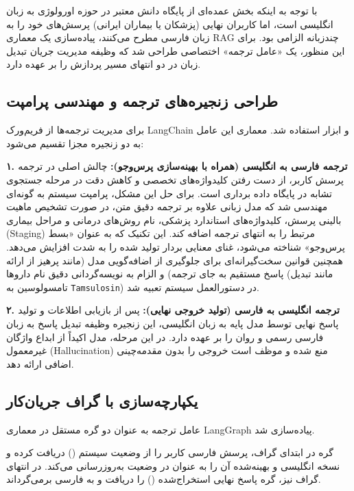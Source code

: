 با توجه به اینکه بخش عمده‌ای از پایگاه دانش معتبر در حوزه اورولوژی به زبان انگلیسی است، اما کاربران نهایی (پزشکان یا بیماران ایرانی) پرسش‌های خود را به زبان فارسی مطرح می‌کنند، پیاده‌سازی یک معماری RAG چندزبانه الزامی بود. برای این منظور، یک «عامل ترجمه» اختصاصی طراحی شد که وظیفه مدیریت جریان تبدیل زبان در دو انتهای مسیر پردازش را بر عهده دارد.

\subsection{طراحی زنجیره‌های ترجمه و مهندسی پرامپت}
برای مدیریت ترجمه‌ها از فریم‌ورک LangChain و ابزار  استفاده شد. معماری این عامل به دو زنجیره مجزا تقسیم می‌شود:

\textbf{۱. ترجمه فارسی به انگلیسی (همراه با بهینه‌سازی پرس‌وجو):}
چالش اصلی در ترجمه پرسش کاربر، از دست رفتن کلیدواژه‌های تخصصی و کاهش دقت در مرحله جستجوی تشابه در پایگاه داده برداری است. برای حل این مشکل، پرامپت سیستم به گونه‌ای مهندسی شد که مدل زبانی علاوه بر ترجمه دقیق متن، در صورت تشخیص ماهیت بالینی پرسش، کلیدواژه‌های استاندارد پزشکی، نام روش‌های درمانی و مراحل بیماری (Staging) مرتبط را به انتهای ترجمه اضافه کند. این تکنیک که به عنوان «بسط پرس‌وجو» شناخته می‌شود، غنای معنایی بردار تولید شده را به شدت افزایش می‌دهد.
همچنین قوانین سخت‌گیرانه‌ای برای جلوگیری از اضافه‌گویی مدل (مانند پرهیز از ارائه پاسخ مستقیم به جای ترجمه) و الزام به نویسه‌گردانی دقیق نام داروها (مانند تبدیل تامسولوسین به \texttt{Tamsulosin}) در دستورالعمل سیستم تعبیه شد.

\textbf{۲. ترجمه انگلیسی به فارسی (تولید خروجی نهایی):}
پس از بازیابی اطلاعات و تولید پاسخ نهایی توسط مدل پایه به زبان انگلیسی، این زنجیره وظیفه تبدیل پاسخ به زبان فارسی رسمی و روان را بر عهده دارد. در این مرحله، مدل اکیداً از ابداع واژگان غیرمعمول (Hallucination) منع شده و موظف است خروجی را بدون مقدمه‌چینی اضافی ارائه دهد.

\subsection{یکپارچه‌سازی با گراف جریان‌کار}
عامل ترجمه به عنوان دو گره مستقل در معماری LangGraph پیاده‌سازی شد.

گره 
 در ابتدای گراف، پرسش فارسی کاربر را از وضعیت سیستم () دریافت کرده و نسخه انگلیسی و بهینه‌شده آن را به عنوان  در وضعیت به‌روزرسانی می‌کند. در انتهای گراف نیز، گره  پاسخ نهایی استخراج‌شده () را دریافت و به فارسی برمی‌گرداند.

